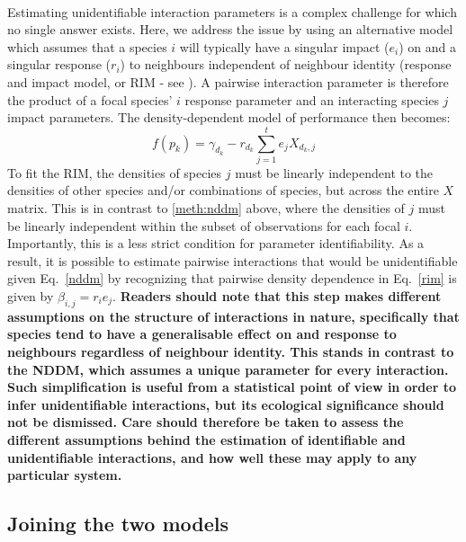 \documentclass[a4,12pt]{article}
\begin{document}
\begin{refsection}
    \paragraph{}
    Estimating unidentifiable interaction parameters is a complex challenge for which no single answer exists. Here, we address the issue by using an alternative model which assumes that a species $i$ will typically have a singular impact ($e_i$) on and a singular response ($r_i$) to neighbours independent of neighbour identity (response and impact model, or RIM - see \cite{Godoy2014b}). A pairwise interaction parameter is therefore the product of a focal species' $i$ response parameter and an interacting species $j$ impact parameters. The density-dependent model of performance then becomes:
        \begin{equation}
        f(p_{k}) = \gamma_{d_k} - r_{d_k} \sum_{j=1}^{t} e_{j} X_{d_k, j}
        \label{rim}
        \end{equation}
    To fit the RIM, the densities of species $j$ must be linearly independent to the densities of other species and/or combinations of species, but across the entire $X$ matrix. This is in contrast to \ref{meth:nddm} above, where the densities of $j$ must be linearly independent within the subset of observations for each focal $i$. Importantly, this is a less strict condition for parameter identifiability. As a result, it is possible to estimate pairwise interactions that would be unidentifiable given Eq.~\ref{nddm} by recognizing that pairwise density dependence in Eq.~\ref{rim} is given by $\beta_{i, j} = r_{i} e_{j}$. \textbf{Readers should note that this step makes different assumptions on the structure of interactions in nature, specifically that species tend to have a generalisable effect on and response to neighbours regardless of neighbour identity. This stands in contrast to the NDDM, which assumes a unique parameter for every interaction. Such simplification is useful from a statistical point of view in order to infer unidentifiable interactions, but its ecological significance should not be dismissed. Care should therefore be taken to assess the different assumptions behind the estimation of identifiable and unidentifiable interactions, and how well these may apply to any particular system.}


    \subsection{Joining the two models}
    \label{meth:addlog}


\end{refsection}
\end{document}
